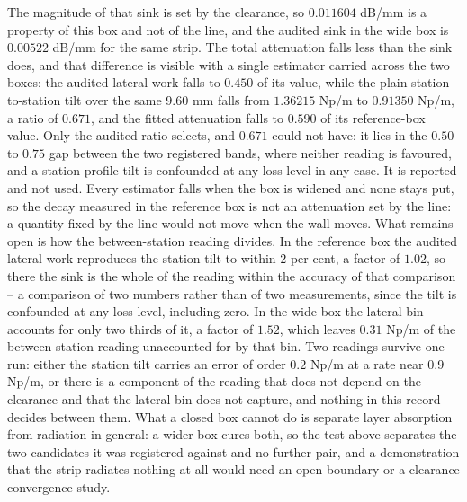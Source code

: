 The magnitude of that sink is set by the clearance, so $0.011604$ dB/mm is a property of this box and not of the
line, and the audited sink in the wide box is $0.00522$ dB/mm for the same strip. The total
attenuation falls less than the sink does, and that difference is visible with a single estimator carried across
the two boxes: the audited lateral work falls to $0.450$ of its value, while the plain station-to-station tilt
over the same $9.60$ mm falls from $1.36215$ Np/m to $0.91350$ Np/m, a ratio of $0.671$, and the fitted
attenuation falls to $0.590$ of its reference-box value. Only the audited ratio selects, and $0.671$ could not
have: it lies in the $0.50$ to $0.75$ gap between the two registered bands, where neither reading is favoured, and
a station-profile tilt is confounded at any loss level in any case. It is reported and not used. Every estimator falls when the box is widened and none
stays put, so the decay measured in the reference box is not an attenuation set by the line: a quantity fixed by
the line would not move when the wall moves. What remains open is how the between-station reading divides. In the
reference box the audited lateral work reproduces the station tilt to within $2$ per cent, a factor of $1.02$,
so there the sink is the whole of the reading within the accuracy of that comparison -- a comparison of two
numbers rather than of two measurements, since the tilt is confounded at any loss level, including zero. In the
wide box the lateral bin accounts for only two thirds of it, a factor of $1.52$, which leaves $0.31$ Np/m of the
between-station reading unaccounted for by that bin. Two readings survive one run: either the station tilt
carries an error of order $0.2$ Np/m at a rate near $0.9$ Np/m, or there is a component of the reading that does
not depend on the clearance and that the lateral bin does not capture, and nothing in this record decides between
them. What a
closed box cannot do is separate layer absorption from radiation in general: a wider box cures both, so the test
above separates the two candidates it was registered against and no further pair, and a demonstration that the
strip radiates nothing at all would need an open boundary or a clearance convergence study.

